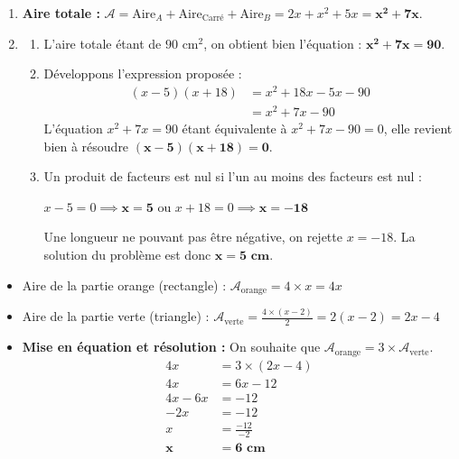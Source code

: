 \documentclass[a4paper]{book}
\begin{document}
    
    \begin{exercice}
        \begin{enumerate}
            \item \textbf{Aire totale :} $\mathcal{A} = \text{Aire}_A + \text{Aire}_{\text{Carré}} + \text{Aire}_B = 2x + x^2 + 5x = \mathbf{x^2 + 7x}$.
            \item 
            \begin{enumerate}
                \item L'aire totale étant de $90\text{ cm}^2$, on obtient bien l'équation : $\mathbf{x^2 + 7x = 90}$.
                \item Développons l'expression proposée :
                \begin{align*}
                    (x - 5)(x + 18) &= x^2 + 18x - 5x - 90 \\
                    &= x^2 + 7x - 90
                \end{align*}
                L'équation $x^2 + 7x = 90$ étant équivalente à $x^2 + 7x - 90 = 0$, elle revient bien à résoudre $\mathbf{(x - 5)(x + 18) = 0}$.
                \item Un produit de facteurs est nul si l'un au moins des facteurs est nul :
                \begin{center}
                    $x - 5 = 0 \implies \mathbf{x = 5}$ \quad ou \quad $x + 18 = 0 \implies \mathbf{x = -18}$
                \end{center}
                Une longueur ne pouvant pas être négative, on rejette $x = -18$. La solution du problème est donc $\mathbf{x = 5\text{ cm}}$.
            \end{enumerate}
        \end{enumerate}
    \end{exercice}


\newpage

    
    \begin{exercice}
        \begin{itemize}
            \item Aire de la partie orange (rectangle) : $\mathcal{A}_{\text{orange}} = 4 \times x = 4x$
            \item Aire de la partie verte (triangle) : $\mathcal{A}_{\text{verte}} = \frac{4 \times (x - 2)}{2} = 2(x - 2) = 2x - 4$
            \item \textbf{Mise en équation et résolution :} On souhaite que $\mathcal{A}_{\text{orange}} = 3 \times \mathcal{A}_{\text{verte}}$.
            \begin{align*}
                4x &= 3 \times (2x - 4) \\
                4x &= 6x - 12 \\
                4x - 6x &= -12 \\
                -2x &= -12 \\
                x &= \frac{-12}{-2} \\
                \mathbf{x} &\mathbf{= 6\text{ cm}}
            \end{align*}
        \end{itemize}
    \end{exercice}
    
\end{document}
